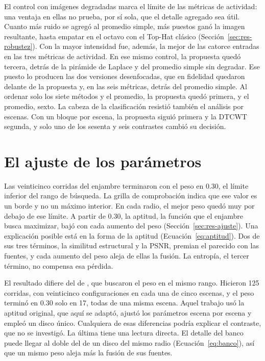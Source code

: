 El control con imágenes degradadas marca el límite de las métricas de actividad: una ventaja en ellas
no prueba, por sí sola, que el detalle agregado sea útil. Cuanto más ruido se agregó al promedio simple,
más puestos ganó la imagen resultante, hasta empatar en el octavo con el Top-Hat clásico
(Sección~\ref{sec:res-robustez}). Con la mayor intensidad fue, además, la mejor de las catorce entradas
en las tres métricas de actividad. En ese mismo control, la propuesta quedó tercera, detrás de la
pirámide de Laplace y del promedio simple sin degradar. Ese puesto lo producen las dos versiones
desenfocadas, que en fidelidad quedaron delante de la propuesta y, en las seis métricas, detrás del promedio
simple. Al ordenar solo los siete métodos y el promedio, la propuesta quedó primera, y el promedio, sexto. La cabeza de la clasificación resistió también el análisis por
escenas. Con un bloque por escena,
la propuesta siguió primera y la DTCWT segunda, y solo uno de los sesenta y seis contrastes cambió su
decisión.

\section{El ajuste de los parámetros}
\label{sec:disc-ajuste}

Las veinticinco corridas del enjambre terminaron con el peso en 0.30, el límite inferior del rango de
búsqueda. La grilla de comprobación indica que ese valor es un borde y no un máximo interior. En cada
radio, el mejor peso quedó muy por debajo de ese límite. A partir de 0.30, la aptitud, la función que
el enjambre busca maximizar, bajó con cada aumento del peso (Sección~\ref{sec:res-ajuste}). Una
explicación posible está en la forma de la aptitud (Ecuación~\ref{eq:aptitud}). Dos de sus tres términos, la similitud estructural y la PSNR, premian el
parecido con las fuentes, y cada aumento del peso aleja de ellas la fusión. La entropía, el tercer
término, no compensa esa pérdida.

El resultado difiere del de \textcite{ortegarodriguez2025}, que buscaron el peso en el mismo rango.
Hicieron 125 corridas, con veinticinco configuraciones en cada una de cinco escenas, y el peso terminó
en 0.30 solo en 17, todas de una misma escena. Aquel trabajo usó la aptitud original, que aquí se
adaptó, ajustó los parámetros escena por escena y empleó un disco único. Cualquiera de esas diferencias
podría explicar el contraste, que no se investigó. La última tiene una lectura directa. El detalle del
banco puede llegar al doble del de un disco del mismo radio (Ecuación~\ref{eq:banco}), así que un
mismo peso aleja más la fusión de sus fuentes.

